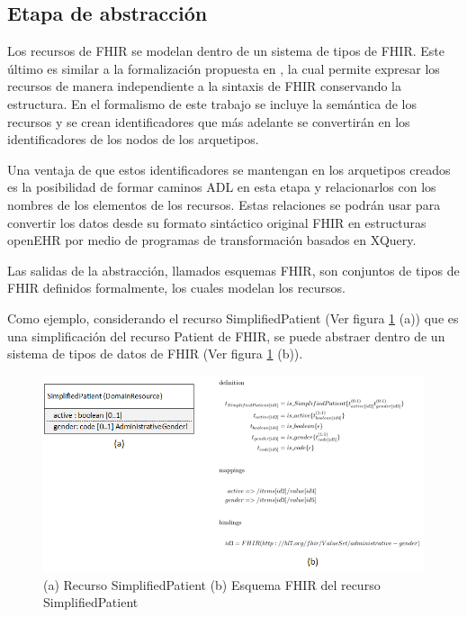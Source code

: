 \subsection{Etapa de abstracción}

Los recursos de FHIR se modelan dentro de un sistema de tipos de FHIR. Este último es similar a la formalización propuesta en \cite{Maldonado09}, la cual permite expresar los recursos de manera independiente a la sintaxis de FHIR conservando la estructura. En el formalismo de este trabajo se incluye la semántica de los recursos y se crean identificadores que más adelante se convertirán en los identificadores de los nodos de los arquetipos.

Una ventaja de que estos identificadores se mantengan en los arquetipos creados es la posibilidad de formar caminos ADL en esta etapa y relacionarlos con los nombres de los elementos de los recursos. Estas relaciones se podrán usar para convertir los datos desde su formato sintáctico original FHIR en estructuras openEHR por medio de programas de transformación basados en XQuery.

Las salidas de la abstracción, llamados esquemas FHIR, son conjuntos de tipos de FHIR definidos formalmente, los cuales modelan los recursos.

Como ejemplo, considerando el recurso SimplifiedPatient (Ver figura \ref{fig:abstraction} (a)) que es una simplificación del recurso Patient de FHIR, se puede abstraer dentro de un sistema de tipos de datos de FHIR (Ver figura \ref{fig:abstraction} (b)).

\begin{figure}
  \includegraphics[scale=0.5]{./images/abstraction}
  \caption{(a) Recurso SimplifiedPatient (b) Esquema FHIR del recurso SimplifiedPatient}
  \label{fig:abstraction}
\end{figure}

